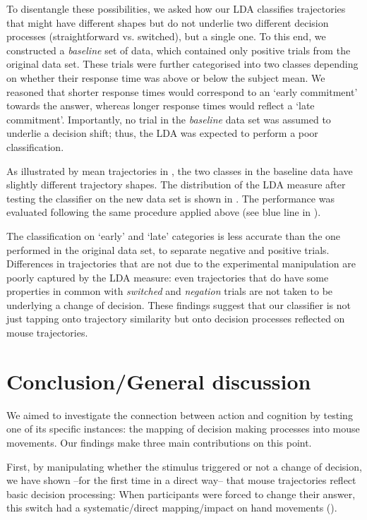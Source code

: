\documentclass{article}
\begin{document}
To disentangle these possibilities, we asked how our LDA classifies trajectories that might have different shapes but do not underlie two different decision processes (straightforward vs. switched), but a single one.
To this end, we constructed a \emph{baseline} set of data, which contained only positive trials from the original data set. These trials were further categorised into two classes depending on whether their response time was above or below the subject mean. We reasoned that shorter response times would correspond to an `early commitment' towards the answer, whereas longer response times would reflect a `late commitment'. Importantly, no trial in the \emph{baseline} data set was assumed to underlie a decision shift; thus, the LDA was expected to perform a poor classification.  

As illustrated by mean trajectories in , the two classes in the baseline data have slightly different trajectory shapes.
The distribution of the LDA measure after testing the classifier on the new data set is shown in . The performance was evaluated following the same procedure applied above (see blue line in ). 

The classification on `early' and `late' categories is less accurate than the one performed in the original data set, to separate negative and positive trials.
Differences in trajectories that are not due to the experimental manipulation are poorly captured by the LDA measure: even trajectories that do have some properties in common with \emph{switched} and \emph{negation} trials are not taken to be underlying a change of decision. 
These findings suggest that our classifier is not just tapping onto trajectory similarity but onto decision processes reflected on mouse trajectories.

\section{Conclusion/General discussion}

We aimed to investigate the connection between action and cognition by testing one of its specific instances: the mapping of decision making processes into mouse movements. Our findings make three main contributions on this point. 

First, by manipulating whether the stimulus triggered or not a change of decision, we have shown --for the first time in a direct way-- that mouse trajectories reflect basic decision processing: When participants were forced to change their answer, this switch had a systematic/direct mapping/impact on hand movements (). 
\end{document}
